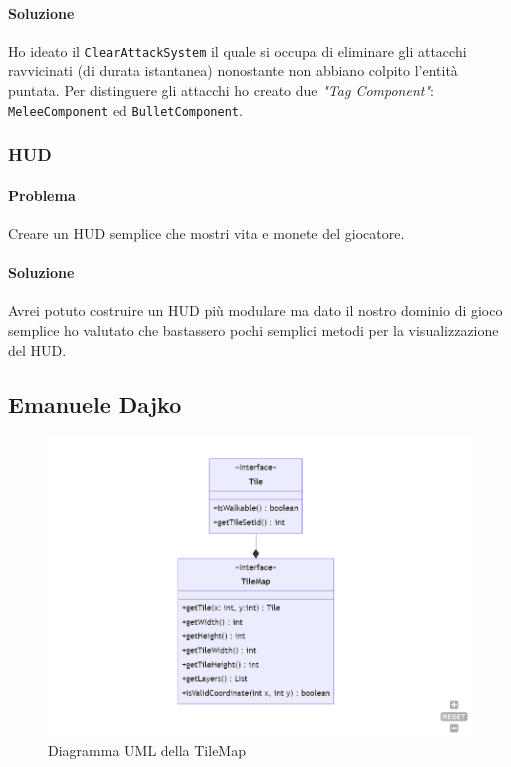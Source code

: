 \documentclass[a4paper,12pt]{report}
\begin{document}
\paragraph{Soluzione}
Ho ideato il \texttt{ClearAttackSystem} il quale si occupa di eliminare gli attacchi
ravvicinati (di durata istantanea) nonostante non abbiano colpito l'entità puntata.
Per distinguere gli attacchi ho creato due \textit{"Tag Component"}: \texttt{MeleeComponent}
ed \texttt{BulletComponent}.

\subsubsection{HUD}

\paragraph{Problema}
Creare un HUD semplice che mostri vita e monete del giocatore.
\paragraph{Soluzione}
Avrei potuto costruire un HUD più modulare ma dato il nostro dominio di 
gioco semplice ho valutato che bastassero pochi semplici metodi per la 
visualizzazione del HUD.

\subsection{Emanuele Dajko}
\begin{figure}[h]
	\centering
	\includegraphics[width=\textwidth]{uml/TileMap.png}
	\caption{Diagramma UML della TileMap}
\end{figure}
\end{document}
